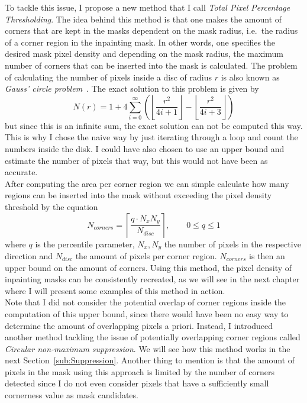 To tackle this issue, I propose a new method that I call \textit{Total Pixel Percentage
Thresholding}. The idea behind this method is that one makes the amount of corners that are kept
in the masks dependent on the mask radius, i.e.\ the radius of a corner region in the inpainting
mask. In other words, one specifies the desired mask pixel density and depending on the mask
radius, the maximum number of corners that can be inserted into the mask is
calculated.
The problem of calculating the number of pixels inside a disc of radius $r$ is also known as
\textit{Gauss' circle problem}~\cite{gaussCircle}. The exact solution to this problem is given
by~\cite{hilbert96}
\begin{equation}
    N(r) = 1 + 4\sum_{i=0}^{\infty}\left(\left\lfloor\frac{r^2}{4i+1}\right\rfloor - \left\lfloor
    \frac{r^2}{4i+3}\right\rfloor\right)
\end{equation}
but since this is an infinite sum, the exact solution can not be computed this way. This is why I
chose the naive way by just iterating through a loop and count the numbers inside the disk.
I could have also chosen to use an upper bound and estimate the number of pixels that 
way, but this would not have been as accurate.\\
\newpage\noindent
After computing the area per corner region we can simple calculate how many regions can be inserted
into the mask without exceeding the pixel density threshold by the equation
\begin{equation}
    N_{corners} = \left\lceil \frac{q \cdot N_{x}N_{y}}{N_{disc}} \right\rceil,\qquad0\leq q\leq 1 
\end{equation}
where $q$ is the percentile parameter, $N_x, N_y$ the number of pixels in the respective direction
and $N_{disc}$ the amount of pixels per corner region. $N_{corners}$ is then an upper bound on the
amount of corners.
Using this method, the pixel density of inpainting masks can be consistently recreated, as we will
see in the next chapter where I will present some examples of this method in action.\\
Note that I did not consider the potential overlap of corner regions inside the
computation of this upper bound, since there would have been no easy way to determine the amount of
overlapping pixels a priori.
Instead, I introduced another method tackling the issue of potentially overlapping corner regions
called \textit{Circular non-maximum suppression}. We will see how this method
works in the next Section~\ref{sub:Suppression}.
Another thing to mention is that the amount of pixels in the mask using this approach is limited by
the number of corners detected since I do not even consider pixels that have a sufficiently small
cornerness value as mask candidates.
\newpage
